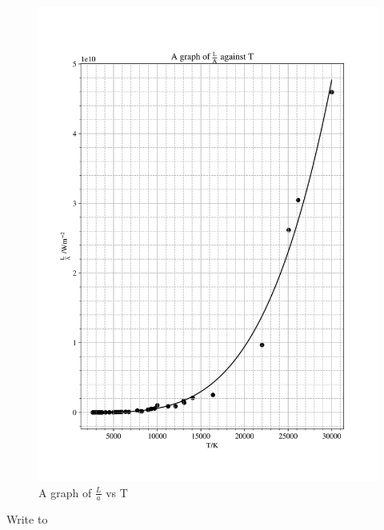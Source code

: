 \documentclass[12pt, a4paper]{article}
\begin{document}
\begin{figure}[H]
    \centering
    \includegraphics[width = \textwidth]{2Plot5.png}
    \caption{A graph of \(\frac{L}{a}\) vs T}
    \label{fig:Fig 2.12}
\end{figure}
Write to
\end{document}
